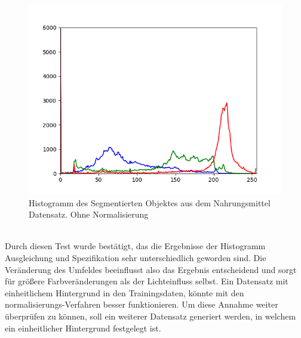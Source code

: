 \documentclass[a4paper,12pt,oneside]{article}
\begin{document}
\begin{figure}[htb]
\begin{minipage}[c]{0.08\textwidth}
\end{minipage}
\hfill
\begin{minipage}[c]{0.3\textwidth}
\includegraphics[width=\textwidth]{Sources/Bild2_histo.png}
\end{minipage}
\caption{Histogramm des Segmentierten Objektes aus dem Nahrungsmittel Datensatz. Ohne Normalisierung}
\label{img:evalnorm}
\end{figure}\\
Durch diesen Test wurde bestätigt, das die Ergebnisse der Histogramm Ausgleichung und Spezifikation sehr unterschiedlich geworden sind. Die Veränderung des Umfeldes beeinflusst also das Ergebnis entscheidend und sorgt für größere Farbveränderungen als der Lichteinfluss selbst.
Ein Datensatz mit einheitlichem Hintergrund in den Trainingsdaten, könnte mit den normalisierungs-Verfahren besser funktionieren. Um diese Annahme weiter überprüfen zu können, soll ein weiterer Datensatz generiert werden, in welchem ein einheitlicher Hintergrund festgelegt ist. 
\end{document}
